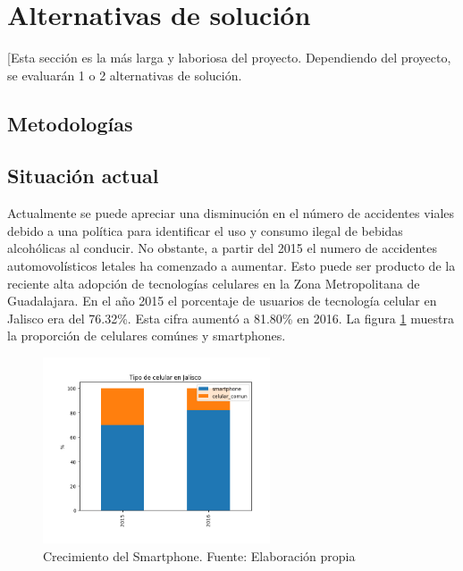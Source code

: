 \documentclass{article}
\begin{document}
\newpage

\section{Alternativas de solución}\label{sec:alternatives}
[Esta sección es la más larga y
laboriosa del proyecto. Dependiendo
del proyecto, se evaluarán 1 o 2
alternativas de solución. 
% 

\subsection{Metodologías}

\subsection{Situación actual}\label{subsec:actual}

Actualmente se puede apreciar una disminución en el número de accidentes viales debido a
una política para identificar el uso y consumo ilegal de bebidas alcohólicas al conducir.
No obstante, a partir del 2015 el numero de accidentes automovolísticos letales ha comenzado
a aumentar. Esto puede ser producto de la reciente alta adopción de tecnologías celulares en la Zona
Metropolitana de Guadalajara. En el año 2015 el porcentaje de usuarios de tecnología celular en Jalisco
era del 76.32\%. Esta cifra aumentó a 81.80\% en 2016. La figura \ref{fig:tipo_celular} muestra la
proporción de celulares comúnes y smartphones.


	\begin{figure}[H]\centering
	\includegraphics[width=0.6\textwidth]{resources/img/tipo_de_celular.png}
	\caption{\label{fig:tipo_celular} Crecimiento del Smartphone. Fuente: Elaboración propia}
    \end{figure}
\end{document}
